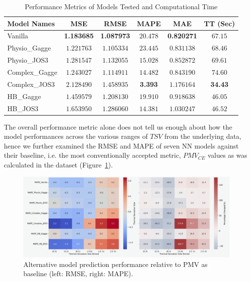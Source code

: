 \begin{table}[htbp]
\centering
\begin{tabular}{l|c|c|c|c|c}
\hline
Model Names & MSE & RMSE & MAPE & MAE & TT (Sec) \\
\hline\hline
Vanilla  & \textbf{1.183685} & \textbf{1.087973} & $20.478$ & \textbf{0.820271} & $67.15$\\
Physio\_Gagge  & $1.221763$ & $1.105334$ & $23.445$ & $0.831138$ & $68.46$ \\
Physio\_JOS3  & $1.281547$ & $1.132055$ & $15.028$ & $0.852872$  & $69.61$\\
Complex\_Gagge  & $1.243027$ & $1.114911$ & $14.482$ & $0.843190$ & $74.60$\\
Complex\_JOS3  & $2.128490$ & $1.458935$ & \textbf{3.393} & $1.176164$ & \textbf{34.43}\\
HB\_Gagge  & $1.459579$ & $1.208130$ & $19.910$ & $0.918638$ & $46.05$\\
HB\_JOS3  & $1.653950$ & $1.286060$ & $14.381$ & $1.030247$ & $46.52$\\\hline
\end{tabular}
\caption{Performance Metrics of Models Tested and Computational Time}
\label{tab:models}
\end{table}

The overall performance metric alone does not tell us enough about how the model performances across the various ranges of $TSV$ from the underlying data, hence we further examined the RMSE and MAPE of seven NN models against their baseline, i.e. the most conventionally accepted metric, $PMV_{CE}$ values as was calculated in the dataset (Figure~\ref{fig:relative-pmv}). 
\begin{figure}[htbp]
    \centering
    \includegraphics[width=\linewidth]{figures/RMSE_MAPE (1).png}
    \caption{Alternative model prediction performance relative to PMV as baseline (left: RMSE, right: MAPE).}
    \label{fig:relative-pmv}
\end{figure}

